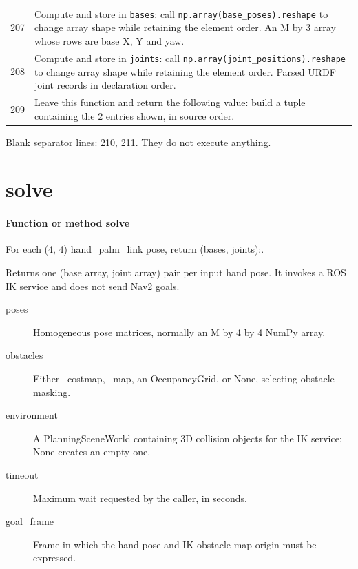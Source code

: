 \documentclass[11pt,a4paper]{book}
\begin{document}
\begin{longtable}{r p{}}
207 & Compute and store in \texttt{bases}: call \texttt{np.array(base\_poses).reshape} to change array shape while retaining the element order. An M by 3 array whose rows are base X, Y and yaw. \\

208 & Compute and store in \texttt{joints}: call \texttt{np.array(joint\_positions).reshape} to change array shape while retaining the element order. Parsed URDF joint records in declaration order. \\

209 & Leave this function and return the following value: build a tuple containing the 2 entries shown, in source order. \\

\end{longtable}

Blank separator lines: 210, 211. They do not execute anything.

\section{solve}

\paragraph{Function or method solve}
For each (4, 4) hand\_palm\_link pose, return (bases, joints):.

Returns one (base array, joint array) pair per input hand pose. It invokes a ROS IK service and does not send Nav2 goals.

\begin{description}
\item[poses] Homogeneous pose matrices, normally an M by 4 by 4 NumPy array.
\item[obstacles] Either --costmap, --map, an OccupancyGrid, or None, selecting obstacle masking.
\item[environment] A PlanningSceneWorld containing 3D collision objects for the IK service; None creates an empty one.
\item[timeout] Maximum wait requested by the caller, in seconds.
\item[goal\_frame] Frame in which the hand pose and IK obstacle-map origin must be expressed.
\end{description}
\end{document}
